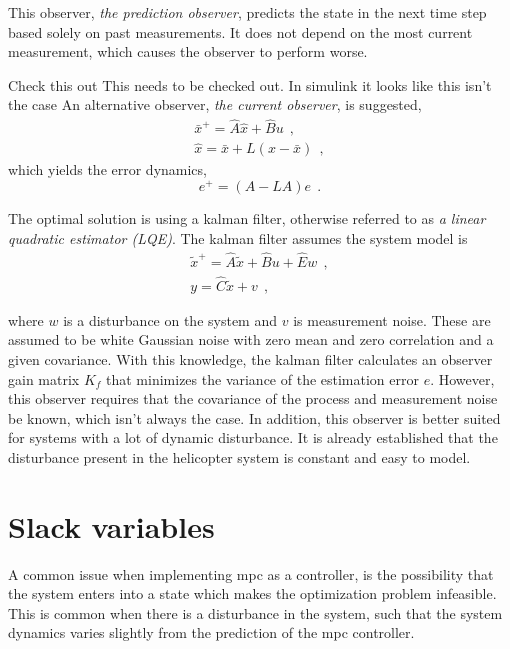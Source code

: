 This observer, \textit{the prediction observer}, predicts the state in the next time step based solely on past measurements. It does not depend on the most current measurement, which causes the observer to perform worse.

Check this out
 This needs to be checked out. In simulink it looks like this isn't the case
An alternative observer, \textit{the current observer}, is suggested,
\begin{equation}
    \begin{split}
        \bar x^+ = \hat A \hat x + \hat B u \: \: , \\
        \hat x = \bar x + L(x - \bar x) \: \: ,
    \end{split}
\end{equation}
which yields the error dynamics,
\begin{equation}
    e^+ = (A - LA) e \: \: .
\end{equation}

The optimal solution is using a kalman filter, otherwise referred to as \textit{a linear quadratic estimator (LQE)}. The kalman filter assumes the system model is 
\begin{equation}
    \begin{split}
        \tilde x^+ = \hat A \tilde x + \hat Bu + \hat Ew \: \: , \\
        y = \hat C \tilde x + v \: \: ,
    \end{split}
\end{equation}

where $w$ is a disturbance on the system and $v$ is measurement noise. These are assumed to be white Gaussian noise with zero mean and zero correlation and a given covariance. With this knowledge, the kalman filter calculates an observer gain matrix $K_f$ that minimizes the variance of the estimation error $e$. However, this observer requires that the covariance of the process and measurement noise be known, which isn't always the case. In addition, this observer is better suited for systems with a lot of dynamic disturbance. It is already established that the disturbance present in the helicopter system is constant and easy to model.



\section{Slack variables}
A common issue when implementing \acrshort{mpc} as a controller, is the possibility that the system enters into a state which makes the optimization problem infeasible. This is common when there is a disturbance in the system, such that the system dynamics varies slightly from the prediction of the \acrshort{mpc} controller.

